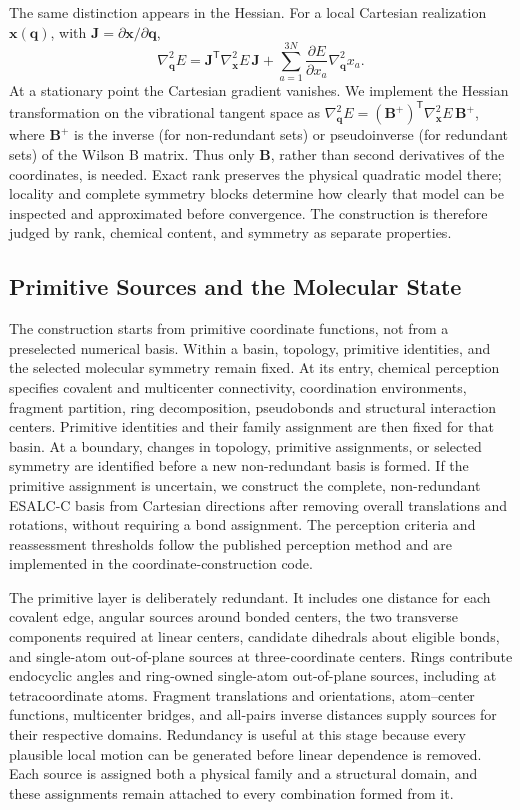 \documentclass[journal=jctcce,manuscript=article,layout=traditional]{achemso}
\newcommand{\Bmat}{\mathbf{B}}
\newcommand{\Jmat}{\mathbf{J}}
\newcommand{\x}{\mathbf{x}}
\newcommand{\q}{\mathbf{q}}
\theoremstyle{definition}
\begin{document}
{The same distinction appears in the Hessian.  For a local
Cartesian realization \(\x(\q)\), with
\(\Jmat=\partial\x/\partial\q\),}
{
\begin{equation}
 \nabla_{\!\q}^{2}E
 =\Jmat^{\mathsf T}\nabla_{\!\x}^{2}E\,\Jmat
 +\sum_{a=1}^{3N}\frac{\partial E}{\partial x_a}
   \nabla_{\!\q}^{2}x_a .
 \label{eq:asymptotic-hessian}
\end{equation}
}
{At a stationary point the Cartesian gradient vanishes. We implement the
Hessian transformation on the vibrational tangent space as
\(\nabla_{\!\q}^{2}E=(\Bmat^+)^{\mathsf T}\nabla_{\!\x}^{2}E\,\Bmat^+\),
where \(\Bmat^+\) is the inverse (for non-redundant sets) or pseudoinverse (for redundant sets) of the Wilson B matrix. Thus only
\(\Bmat\), rather than second derivatives of the coordinates, is needed.
Exact rank preserves the physical quadratic model there; locality and
complete symmetry blocks determine how clearly that model can be inspected
and approximated before convergence. The construction is therefore judged
by rank, chemical content, and symmetry as separate properties.}

\subsection{Primitive Sources and the Molecular State}

{The construction starts from primitive coordinate functions,
not from a preselected numerical basis.  Within a basin, topology, primitive
identities, and the selected molecular symmetry remain fixed. At its entry,
chemical perception specifies covalent and multicenter
connectivity, coordination environments, fragment partition, ring decomposition,
pseudobonds and structural interaction centers. Primitive identities and
their family assignment are then fixed for that basin. At a boundary, changes
in topology, primitive assignments, or selected symmetry are identified before a new
non-redundant basis is formed.  If the primitive assignment is uncertain,
{we construct the complete, non-redundant ESALC-C basis from
Cartesian directions after removing overall translations and rotations,
without requiring a bond assignment.}  The perception criteria and
reassessment thresholds follow the published perception method\cite{Barone2026Perception}
and are implemented in the coordinate-construction code.}

The primitive layer is deliberately redundant.  It includes one distance for
each covalent edge, angular sources around bonded centers, the two transverse
components required at linear centers, candidate dihedrals about eligible
bonds, and single-atom out-of-plane sources at three-coordinate centers.
Rings contribute endocyclic angles and ring-owned single-atom out-of-plane
sources, including at tetracoordinate atoms. Fragment translations and
orientations, atom--center functions, multicenter bridges, and all-pairs
inverse distances supply sources for their respective domains.  Redundancy is useful
at this stage because every plausible local motion can be generated before
linear dependence is removed.  Each source is assigned both a physical family
and a structural domain, and these assignments remain attached to every
combination formed from it.
\end{document}

